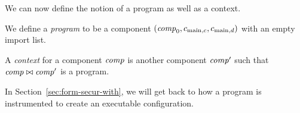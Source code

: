 \documentclass[acmsmall,review,anonymous]{acmart}\settopmatter{printfolios=true,printccs=false,printacmref=false}
\renewcommand{\comp}{\var{comp}}
\begin{document}
We can now define the notion of a program as well as a context.
\begin{definition}
  \label{def:program-and-context}
  We define a \emph{program} to be a component $(\comp_0,c_{\mathrm{main},c}, c_{\mathrm{main},d})$ with an empty import list.

  A \emph{context} for a component $\comp$ is another component $\comp'$ such that $\comp \bowtie \comp'$ is a program.
\end{definition}
In Section~\ref{sec:form-secur-with}, we will get back to how a program is instrumented to create an executable configuration.
\end{document}
